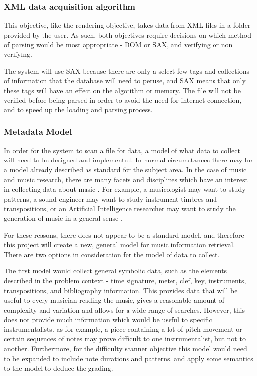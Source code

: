 \subsubsection{XML data acquisition algorithm}
This objective, like the rendering objective, takes data from XML files in a folder provided by the user. As such, both objectives require decisions on which method of parsing would be most appropriate - DOM or SAX, and verifying or non verifying.

The system will use SAX because there are only a select few tags and collections of information that the database will need to peruse, and SAX means that only these tags will have an effect on the algorithm or memory.
The file will not be verified before being parsed in order to avoid the need for internet connection, and to speed up the loading and parsing process.

\subsubsection{Metadata Model}
In order for the system to scan a file for data, a model of what data to collect will need to be designed and implemented. In normal circumstances there may be a model already described as standard for the subject area. In the case of music and music research, there are many facets and disciplines which have an interest in collecting data about music \parencite{MIR}. For example, a musicologist may want to study patterns, a sound engineer may want to study instrument timbres and transpositions, or an Artificial Intelligence researcher may want to study the generation of music in a general sense \parencite{creativeMachines}. 

For these reasons, there does not appear to be a standard model, and therefore this project will create a new, general model for music information retrieval.
There are two options in consideration for the model of data to collect.

The first model would collect general symbolic data, such as the elements described in the problem context - time signature, meter, clef, key, instruments, transpositions, and bibliography information. This provides data that will be useful to every musician reading the music, gives a reasonable amount of complexity and variation and allows for a wide range of searches.
However, this does not provide much information which would be useful to specific instrumentalists. as for example, a piece containing a lot of pitch movement or certain sequences of notes may prove difficult to one instrumentalist, but not to another. 
Furthermore, for the difficulty scanner objective this model would need to be expanded to include note durations and patterns, and apply some semantics to the model to deduce the grading.

